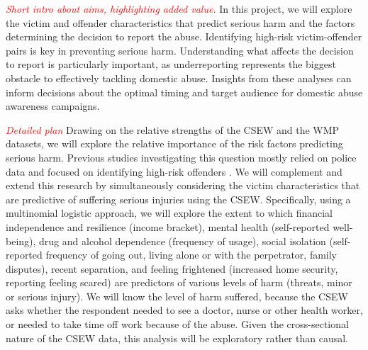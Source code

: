\documentclass[11pt, a4paper]{article}
\begin{document}
 \textcolor{red}{\textit{Short intro about aims, highlighting added value.}} In this project, we will explore the victim and offender characteristics that predict serious harm and the factors determining the decision to report the abuse. Identifying high-risk victim-offender pairs is key in preventing serious harm. Understanding what affects the decision to report is particularly important, as underreporting represents the biggest obstacle to effectively tackling domestic abuse. Insights from these analyses can inform decisions about the optimal timing and target audience for domestic abuse awareness campaigns.
%
%
%
%

\textcolor{red}{\textit{Detailed plan}} Drawing on the relative strengths of the CSEW and the WMP datasets, we will explore the relative importance of the risk factors predicting serious harm. Previous studies investigating this question mostly relied on police data and focused on identifying high-risk offenders \cite{thornton}. We will complement and extend this research by simultaneously considering the victim characteristics that are predictive of suffering serious injuries using the CSEW. Specifically, using a multinomial logistic approach, we will explore the extent to which financial independence and resilience (income bracket), mental health (self-reported well-being), drug and alcohol dependence (frequency of usage), social isolation (self-reported frequency of going out, living alone or with the perpetrator, family disputes), recent separation, and feeling frightened (increased home security, reporting feeling scared) are predictors of various levels of harm (threats, minor or serious injury). We will know the level of harm suffered, because the CSEW asks whether the respondent needed to see a doctor, nurse or other health worker, or needed to take time off work because of the abuse. Given the cross-sectional nature of the CSEW data, this analysis will be exploratory rather than causal.
\end{document}
